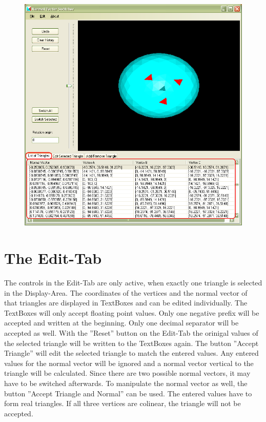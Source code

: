 \begin{figure}[hb]
	\centering
	\includegraphics[width=0.9\linewidth]{window4}
\end{figure}

\newpage
\section{The Edit-Tab}

The controls in the Edit-Tab are only active, when exactly one triangle is selected in the Display-Area. The coordinates of the vertices and the normal vector of that triangles are displayed in TextBoxes and can be edited individually. The TextBoxes will only accept floating point values. Only one negative prefix will be accepted and written at the beginning. Only one decimal separator will be accepted as well. With the ''Reset'' button on the Edit-Tab the orinigal values of the selected triangle will be written to the TextBoxes again. The button ''Accept Triangle'' will edit the selected triangle to match the entered values. Any entered values for the normal vector will be ignored and a normal vector vertical to the triangle will be calculated. Since there are two possible normal vectors, it may have to be switched afterwards. To manipulate the normal vector as well, the button ''Accept Triangle and Normal'' can be used. The entered values have to form real triangles. If all three vertices are colinear, the triangle will not be accepted. 

